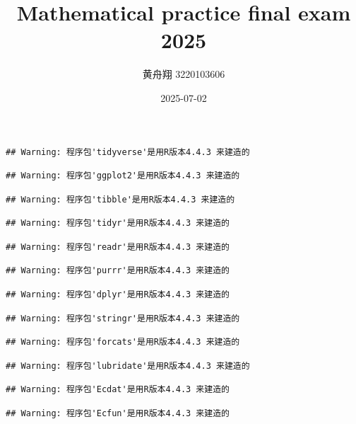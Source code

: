 \documentclass[
]{article}
\title{Mathematical practice final exam 2025}
\author{黄舟翔 3220103606}
\date{2025-07-02}
\begin{document}
\maketitle

\begin{verbatim}
## Warning: 程序包'tidyverse'是用R版本4.4.3 来建造的
\end{verbatim}

\begin{verbatim}
## Warning: 程序包'ggplot2'是用R版本4.4.3 来建造的
\end{verbatim}

\begin{verbatim}
## Warning: 程序包'tibble'是用R版本4.4.3 来建造的
\end{verbatim}

\begin{verbatim}
## Warning: 程序包'tidyr'是用R版本4.4.3 来建造的
\end{verbatim}

\begin{verbatim}
## Warning: 程序包'readr'是用R版本4.4.3 来建造的
\end{verbatim}

\begin{verbatim}
## Warning: 程序包'purrr'是用R版本4.4.3 来建造的
\end{verbatim}

\begin{verbatim}
## Warning: 程序包'dplyr'是用R版本4.4.3 来建造的
\end{verbatim}

\begin{verbatim}
## Warning: 程序包'stringr'是用R版本4.4.3 来建造的
\end{verbatim}

\begin{verbatim}
## Warning: 程序包'forcats'是用R版本4.4.3 来建造的
\end{verbatim}

\begin{verbatim}
## Warning: 程序包'lubridate'是用R版本4.4.3 来建造的
\end{verbatim}

\begin{verbatim}
## Warning: 程序包'Ecdat'是用R版本4.4.3 来建造的
\end{verbatim}

\begin{verbatim}
## Warning: 程序包'Ecfun'是用R版本4.4.3 来建造的
\end{verbatim}
\end{document}
